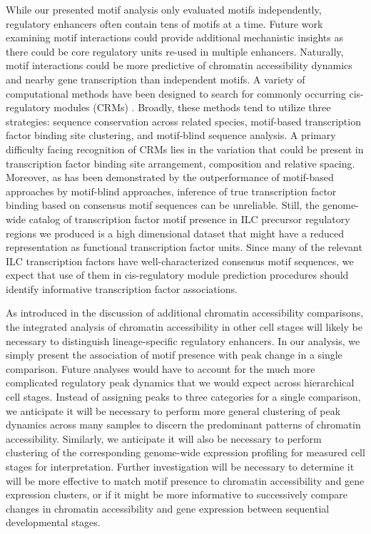 While our presented motif analysis only evaluated motifs independently, regulatory enhancers often contain tens of motifs at a time. Future work examining motif interactions could provide additional mechanistic insights as there could be core regulatory units re-used in multiple enhancers. Naturally, motif interactions could be more predictive of chromatin accessibility dynamics and nearby gene transcription than independent motifs. A variety of computational methods have been designed to search for commonly occurring cis-regulatory modules (CRMs) \cite{Suryamohan2015}. Broadly, these methods tend to utilize three strategies: sequence conservation across related species, motif-based transcription factor binding site clustering, and motif-blind sequence analysis. A primary difficulty facing recognition of CRMs lies in the variation that could be present in transcription factor binding site arrangement, composition and relative spacing. Moreover, as has been demonstrated by the outperformance of motif-based approaches by motif-blind approaches, inference of true transcription factor binding based on consensus motif sequences can be unreliable. Still, the genome-wide catalog of transcription factor motif presence in ILC precursor regulatory regions we produced is a high dimensional dataset that might have a reduced representation as functional transcription factor units. Since many of the relevant ILC transcription factors have well-characterized consensus motif sequences, we expect that use of them in cis-regulatory module prediction procedures should identify informative transcription factor associations.

As introduced in the discussion of additional chromatin accessibility comparisons, the integrated analysis of chromatin accessibility in other cell stages will likely be necessary to distinguish lineage-specific regulatory enhancers. In our analysis, we simply present the association of motif presence with peak change in a single comparison. Future analyses would have to account for the much more complicated regulatory peak dynamics that we would expect across hierarchical cell stages. Instead of assigning peaks to three categories for a single comparison, we anticipate it will be necessary to perform more general clustering of peak dynamics across many samples to discern the predominant patterns of chromatin accessibility. Similarly, we anticipate it will also be necessary to perform clustering of the corresponding genome-wide expression profiling for measured cell stages for interpretation. Further investigation will be necessary to determine it will be more effective to match motif presence to chromatin accessibility and gene expression clusters, or if it might be more informative to successively compare changes in chromatin accessibility and gene expression between sequential developmental stages.

